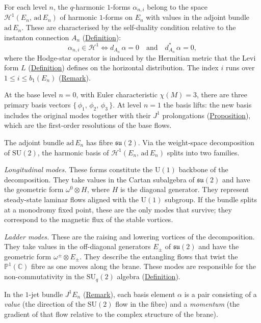 \begin{remark}
  \label{rem:q-harmonic-basis-brane}
For each level $n$, the $q$-harmonic $1$-forms $\alpha_{n,i}$ belong to the
space $\mathcal{H}^1(E_n,\, \mathrm{ad}\, E_n)$ of harmonic $1$-forms on
$E_n$ with values in the adjoint bundle $\mathrm{ad}\, E_n$.  These are
characterised by the self-duality condition relative to the instanton
connection $A_n$
(\hyperref[def:recursive-brane-tower]{Definition}):
\[
\alpha_{n,i} \in \mathcal{H}^1
  \iff
  d_{A_n}\,\alpha = 0
  \quad\text{and}\quad
  d_{A_n}^*\,\alpha = 0,
\]
where the Hodge-star operator is induced by the Hermitian metric that the
Levi form $L$ (\hyperref[def:substrate-parameter]{Definition}) defines on the
horizontal distribution.
The index $i$ runs over $1 \leq i \leq b_1(E_n)$
(\hyperref[rem:betti-numbers-brane]{Remark}).

At the base level $n = 0$, with Euler characteristic $\chi(M) = 3$, there are
three primary basis vectors $\{\,\phi_1,\, \phi_2,\, \phi_3\,\}$.  At
level $n = 1$ the basis lifts: the new basis includes the original modes
together with their $J^1$ prolongations
(\hyperref[prop:jet-prolongation]{Proposition}), which are the first-order
resolutions of the base flows.
\end{remark}

\begin{remark}
  \label{rem:weight-space-decomposition}
The adjoint bundle $\mathrm{ad}\, E_n$ has fibre $\mathfrak{su}(2)$.  Via the
weight-space decomposition of $\mathrm{SU}(2)$, the harmonic basis of
$\mathcal{H}^1(E_n,\, \mathrm{ad}\, E_n)$ splits into two families.

\emph{Longitudinal modes.}
These forms constitute the $\mathrm{U}(1)$ backbone of the decomposition.
They take values in the Cartan subalgebra of $\mathfrak{su}(2)$ and have the
geometric form $\omega^0 \otimes H$, where $H$ is the diagonal generator.
They represent steady-state laminar flows aligned with the $\mathrm{U}(1)$
subgroup.  If the bundle splits at a monodromy fixed point, these are the only
modes that survive; they correspond to the magnetic flux of the stable
vortices.

\emph{Ladder modes.}
These are the raising and lowering vortices of the decomposition.  They take
values in the off-diagonal generators $E_\pm$ of $\mathfrak{su}(2)$ and have
the geometric form $\omega^\pm \otimes E_\pm$.  They describe the entangling
flows that twist the $\mathbb{P}^1(\mathbb{C})$ fibre as one moves along the brane.
These modes are responsible for the non-commutativity in the
$\mathrm{SU}_q(2)$ algebra (\hyperref[def:direct-limit-algebra]{Definition}).

In the $1$-jet bundle $J^1 E_n$
(\hyperref[rem:j1e-local-states]{Remark}), each basis element $\alpha$ is a pair
consisting of a \emph{value} (the direction of the $\mathrm{SU}(2)$ flow in
the fibre) and a \emph{momentum} (the gradient of that flow relative to the
complex structure of the brane).
\end{remark}

